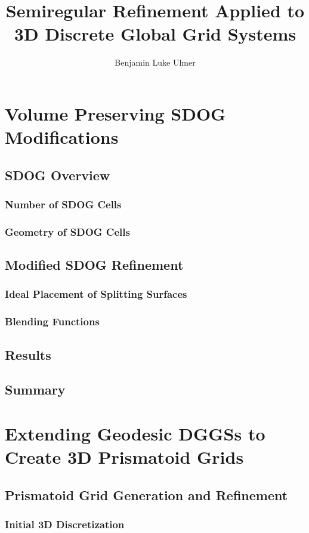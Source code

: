 \documentclass[12pt]{ucalgthes1}
\title{Semiregular Refinement Applied to 3D Discrete Global Grid Systems}
\author{Benjamin Luke Ulmer}
\begin{document}






\chapter{Volume Preserving SDOG Modifications}
\section{SDOG Overview}
\subsection{Number of SDOG Cells}
\subsection{Geometry of SDOG Cells}
\section{Modified SDOG Refinement}
\subsection{Ideal Placement of Splitting Surfaces}
\subsection{Blending Functions}
\section{Results}
\section{Summary}

\chapter{Extending Geodesic DGGSs to Create 3D Prismatoid Grids}
\section{Prismatoid Grid Generation and Refinement}
\subsection{Initial 3D Discretization}
\end{document}

